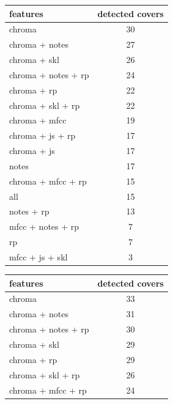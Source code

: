 \begin{table}[H]
	\begin{minipage}{0.5\textwidth}
		\begin{center}
			\begin{tabular}{|l||c|}
				\hline
				features & detected covers\\
				\hline
				\hline
				chroma & 30\\
				\hline
				chroma + notes & 27\\
				\hline
				chroma + skl & 26\\
				\hline
				chroma + notes + rp & 24\\
				\hline
				chroma + rp & 22\\
				\hline
				chroma + skl + rp & 22\\
				\hline
				chroma + mfcc & 19\\
				\hline
				chroma + js + rp & 17\\
				\hline
				chroma + js & 17\\
				\hline
				notes & 17\\
				\hline
				chroma + mfcc + rp & 15\\
				\hline
				all & 15\\
				\hline
				notes + rp & 13\\
				\hline
				mfcc + notes + rp & 7\\
				\hline
				rp & 7\\
				\hline
				mfcc + js + skl & 3\\
				\hline
			\end{tabular}
		\end{center}
	\end{minipage}
	\begin{minipage}{0.5\textwidth}
		\begin{center}
			\begin{tabular}{|l||c|}
				\hline
				features & detected covers\\
				\hline
				\hline
				chroma & 33\\
				\hline
				chroma + notes & 31\\
				\hline
				chroma + notes + rp & 30\\
				\hline
				chroma + skl & 29\\
				\hline
				chroma + rp & 29\\
				\hline
				chroma + skl + rp & 26\\
				\hline
				chroma + mfcc + rp & 24\\

\end{tabular}
\end{center}
\end{minipage}
\end{table}
